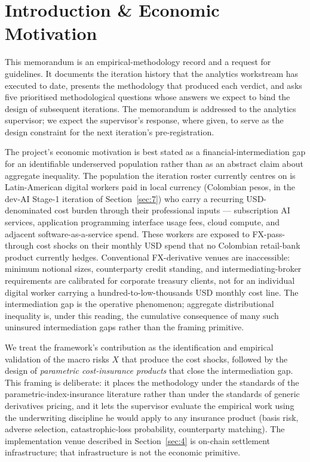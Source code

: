 \section{Introduction \& Economic Motivation}\label{sec:1}

This memorandum is an empirical-methodology record and a request for
guidelines. It documents the iteration history that the analytics workstream
has executed to date, presents the methodology that produced each verdict,
and asks five prioritised methodological questions whose answers we expect to
bind the design of subsequent iterations. The memorandum is addressed to the
analytics supervisor; we expect the supervisor's response, where given, to
serve as the design constraint for the next iteration's pre-registration.

The project's economic motivation is best stated as a financial-intermediation
gap for an identifiable underserved population rather than as an abstract
claim about aggregate inequality. The population the iteration roster
currently centres on is Latin-American digital workers paid in local
currency (Colombian pesos, in the dev-AI Stage-1 iteration of
Section~\ref{sec:7}) who carry a recurring USD-denominated cost burden
through their professional inputs --- subscription AI services, application
programming interface usage fees, cloud compute, and adjacent
software-as-a-service spend. These workers are exposed to FX-pass-through
cost shocks on their monthly USD spend that no Colombian retail-bank
product currently hedges. Conventional FX-derivative venues are
inaccessible: minimum notional sizes, counterparty credit standing, and
intermediating-broker requirements are calibrated for corporate treasury
clients, not for an individual digital worker carrying a
hundred-to-low-thousands USD monthly cost line. The intermediation gap is
the operative phenomenon; aggregate distributional inequality is, under
this reading, the cumulative consequence of many such uninsured
intermediation gaps rather than the framing primitive.

We treat the framework's contribution as the identification and
empirical validation of the macro risks \(X\) that produce the cost shocks,
followed by the design of \emph{parametric cost-insurance products} that
close the intermediation gap. This framing is deliberate: it places the
methodology under the standards of the parametric-index-insurance
literature \citep{carter_etal_2017,mahul_stutley_2010,clarke_2016} rather
than under the standards of generic derivatives pricing, and it lets the
supervisor evaluate the empirical work using the underwriting discipline he
would apply to any insurance product (basis risk, adverse selection,
catastrophic-loss probability, counterparty matching). The implementation
venue described in Section~\ref{sec:4} is on-chain settlement
infrastructure; that infrastructure is not the economic primitive.

